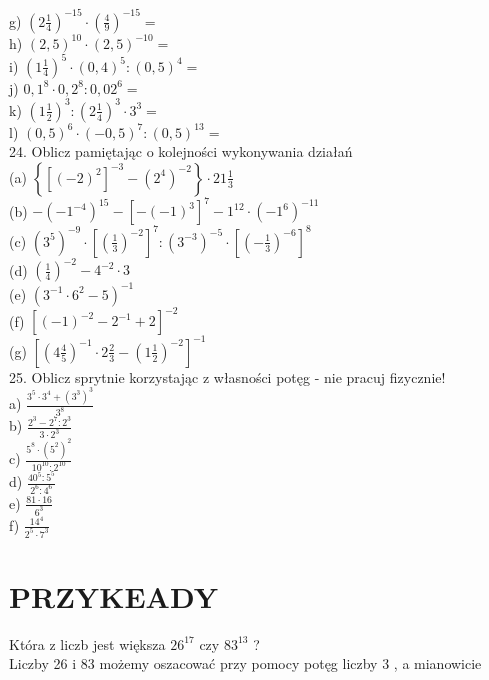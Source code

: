 \documentclass[10pt]{article}
\begin{document}
g) \(\left(2 \frac{1}{4}\right)^{-15} \cdot\left(\frac{4}{9}\right)^{-15}=\)\\
h) \((2,5)^{10} \cdot(2,5)^{-10}=\)\\
i) \(\left(1 \frac{1}{4}\right)^{5} \cdot(0,4)^{5}:(0,5)^{4}=\)\\
j) \(0,1^{8} \cdot 0,2^{8}: 0,02^{6}=\)\\
k) \(\left(1 \frac{1}{2}\right)^{3}:\left(2 \frac{1}{4}\right)^{3} \cdot 3^{3}=\)\\
l) \((0,5)^{6} \cdot(-0,5)^{7}:(0,5)^{13}=\)\\
24. Oblicz pamiętając o kolejności wykonywania działań\\
(a) \(\left\{\left[(-2)^{2}\right]^{-3}-\left(2^{4}\right)^{-2}\right\} \cdot 21 \frac{1}{3}\)\\
(b) \(-\left(-1^{-4}\right)^{15}-\left[-(-1)^{3}\right]^{7}-1^{12} \cdot\left(-1^{6}\right)^{-11}\)\\
(c) \(\left(3^{5}\right)^{-9} \cdot\left[\left(\frac{1}{3}\right)^{-2}\right]^{7}:\left(3^{-3}\right)^{-5} \cdot\left[\left(-\frac{1}{3}\right)^{-6}\right]^{8}\)\\
(d) \(\left(\frac{1}{4}\right)^{-2}-4^{-2} \cdot 3\)\\
(e) \(\left(3^{-1} \cdot 6^{2}-5\right)^{-1}\)\\
(f) \(\left[(-1)^{-2}-2^{-1}+2\right]^{-2}\)\\
(g) \(\left[\left(4 \frac{4}{5}\right)^{-1} \cdot 2 \frac{2}{3}-\left(1 \frac{1}{2}\right)^{-2}\right]^{-1}\)\\
25. Oblicz sprytnie korzystając z własności potęg - nie pracuj fizycznie!\\
a) \(\frac{3^{5} \cdot 3^{4}+\left(3^{3}\right)^{3}}{3^{8}}\)\\
b) \(\frac{2^{3}-2^{7}: 2^{3}}{3 \cdot 2^{3}}\)\\
c) \(\frac{5^{8} \cdot\left(5^{2}\right)^{2}}{10^{10}: 2^{10}}\)\\
d) \(\frac{40^{5}: 5^{5}}{2^{6}: 4^{6}}\)\\
e) \(\frac{81 \cdot 16}{6^{3}}\)\\
f) \(\frac{14^{4}}{2^{5} \cdot 7^{3}}\)

\section*{PRZYKEADY}
Która z liczb jest większa \(26^{17}\) czy \(83^{13}\) ?\\
Liczby 26 i 83 możemy oszacować przy pomocy potęg liczby 3 , a mianowicie
\end{document}

